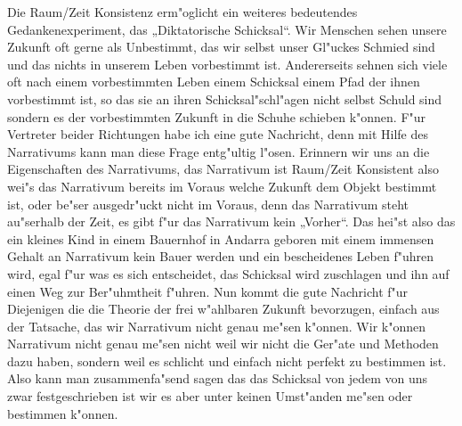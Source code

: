 \documentclass[a5paper,8pt]{book}
\begin{document}
Die Raum/Zeit Konsistenz erm"oglicht ein weiteres bedeutendes Gedankenexperiment, das „Diktatorische Schicksal“. Wir Menschen sehen unsere Zukunft oft gerne als Unbestimmt, das wir selbst unser Gl"uckes Schmied sind und das nichts in unserem Leben vorbestimmt ist. Andererseits sehnen sich viele oft nach einem vorbestimmten Leben einem Schicksal einem Pfad der ihnen vorbestimmt ist, so das sie an ihren Schicksal"schl"agen nicht selbst Schuld sind sondern es der vorbestimmten Zukunft in die Schuhe schieben k"onnen.
F"ur Vertreter beider Richtungen habe ich eine gute Nachricht, denn mit Hilfe des Narrativums kann man diese Frage entg"ultig l"osen.
Erinnern wir uns an die Eigenschaften des Narrativums, das Narrativum ist Raum/Zeit Konsistent also wei"s das Narrativum bereits im Voraus welche Zukunft dem Objekt bestimmt ist, oder be"ser ausgedr"uckt nicht im Voraus, denn das Narrativum steht au"serhalb der Zeit, es gibt f"ur das Narrativum kein „Vorher“. Das hei"st also das ein kleines Kind in einem Bauernhof in Andarra geboren mit einem immensen Gehalt an Narrativum kein Bauer werden und ein bescheidenes Leben f"uhren wird, egal f"ur was es sich entscheidet, das Schicksal wird zuschlagen und ihn auf einen Weg zur Ber"uhmtheit f"uhren.
Nun kommt die gute Nachricht f"ur Diejenigen die die Theorie der frei w"ahlbaren Zukunft bevorzugen, einfach aus der Tatsache, das wir Narrativum nicht genau me"sen k"onnen. Wir k"onnen Narrativum nicht genau me"sen nicht weil wir nicht die Ger"ate und Methoden dazu haben, sondern weil es schlicht und einfach nicht perfekt zu bestimmen ist.
Also kann man zusammenfa"send sagen das das Schicksal von jedem von uns zwar festgeschrieben ist wir es aber unter keinen Umst"anden me"sen oder bestimmen k"onnen.
\end{document}
